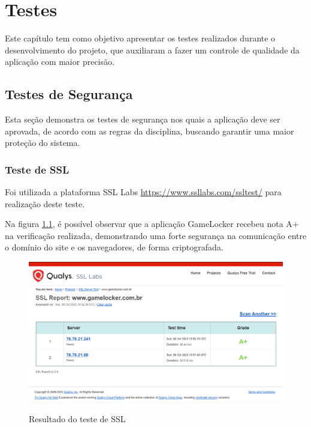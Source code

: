 \chapter{Testes}
Este capítulo tem como objetivo apresentar os testes realizados durante o desenvolvimento do projeto, que auxiliaram a fazer um controle de qualidade da aplicação com maior precisão.





\section{Testes de Segurança}
Esta seção demonstra os testes de segurança nos quais a aplicação deve ser aprovada, de acordo com as regras da disciplina, buscando garantir uma maior proteção do sistema.

\subsection{Teste de SSL}
Foi utilizada a plataforma SSL Labs \url{https://www.ssllabs.com/ssltest/} para realização deste teste.

Na figura \ref{testeSSL}, é possível observar que a aplicação GameLocker recebeu nota A+ na verificação realizada, demonstrando uma forte segurança na comunicação entre o domínio do site e os navegadores, de forma criptografada.

\begin{figure}[H]
        \center
	\caption{\label{fig_sge20}Resultado do teste de SSL}
    \includegraphics[scale=0.50]{imagens/testes/TESTESSL.png}
    \label{testeSSL}
\end{figure}

